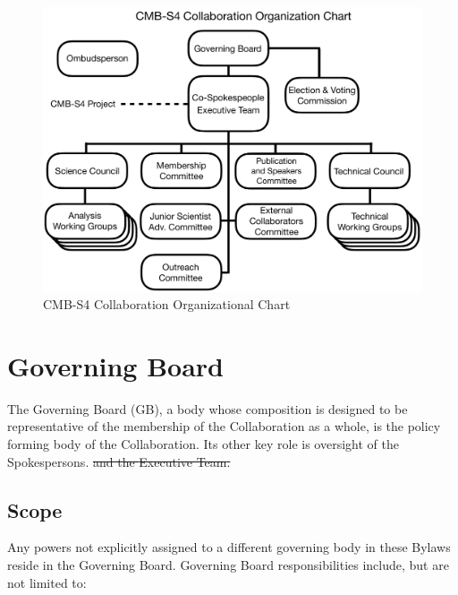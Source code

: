 \documentclass[12pt]{article}
\newcommand{\exec}{{Executive Team}}
\begin{document}
\begin{figure}[h!]
\begin{center}
\includegraphics[width=6.5in]{CMB-S4_Org_chart_+_details_v10.pdf}
\end{center}
\caption{CMB-S4 Collaboration Organizational Chart}
\label{fig:org_chart}
\end{figure}

\section{Governing Board}

The Governing Board (GB), a body whose composition is designed to be representative of the membership of the Collaboration as a whole, is the %
policy forming body of the Collaboration.  Its other key role is oversight of the Spokespersons. {\color{red} \sout{and the \exec.}}

\subsection{Scope}
Any powers not explicitly assigned to a different governing body in these Bylaws reside in the Governing Board.
Governing Board responsibilities include, but are not limited to:  %
\end{document}
